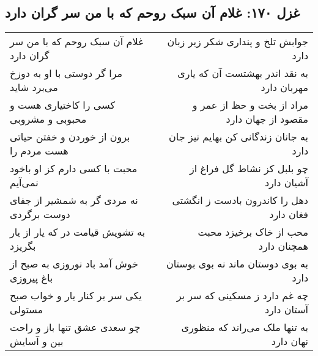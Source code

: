 \begin{center}
\section*{غزل ۱۷۰: غلام آن سبک روحم که با من سر گران دارد}
\label{sec:170}
\begin{longtable}{l p{0.5cm} r}
غلام آن سبک روحم که با من سر گران دارد
&&
جوابش تلخ و پنداری شکر زیر زبان دارد
\\
مرا گر دوستی با او به دوزخ می‌برد شاید
&&
به نقد اندر بهشتست آن که یاری مهربان دارد
\\
کسی را کاختیاری هست و محبوبی و مشروبی
&&
مراد از بخت و حظ از عمر و مقصود از جهان دارد
\\
برون از خوردن و خفتن حیاتی هست مردم را
&&
به جانان زندگانی کن بهایم نیز جان دارد
\\
محبت با کسی دارم کز او باخود نمی‌آیم
&&
چو بلبل کز نشاط گل فراغ از آشیان دارد
\\
نه مردی گر به شمشیر از جفای دوست برگردی
&&
دهل را کاندرون بادست ز انگشتی فغان دارد
\\
به تشویش قیامت در که یار از یار بگریزد
&&
محب از خاک برخیزد محبت همچنان دارد
\\
خوش آمد باد نوروزی به صبح از باغ پیروزی
&&
به بوی دوستان ماند نه بوی بوستان دارد
\\
یکی سر بر کنار یار و خواب صبح مستولی
&&
چه غم دارد ز مسکینی که سر بر آستان دارد
\\
چو سعدی عشق تنها باز و راحت بین و آسایش
&&
به تنها ملک می‌راند که منظوری نهان دارد
\\
\end{longtable}
\end{center}

